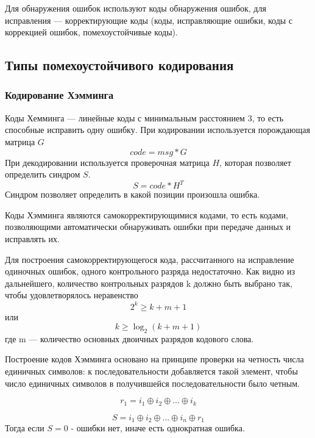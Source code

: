 Для обнаружения ошибок используют коды обнаружения ошибок, для исправления — корректирующие коды (коды, исправляющие ошибки, коды с коррекцией ошибок, помехоустойчивые коды).

\subsection{Типы помехоустойчивого кодирования}
\subsubsection{Кодирование Хэмминга}
Коды Хемминга — линейные коды с минимальным расстоянием 3, то есть способные исправить одну ошибку. 
При кодировании используется порождающая матрица $G$
\begin{equation}
code = msg * G
\end{equation}
При декодировании используется проверочная матрица $H$, которая позволяет определить синдром $S$.
\begin{equation}
S = code * H^T
\end{equation}
Синдром позволяет определить в какой позиции произошла ошибка.

Коды Хэмминга являются самокорректирующимися кодами, то есть кодами, позволяющими автоматически обнаруживать ошибки при передаче данных и исправлять их.

Для построения самокорректирующегося кода, рассчитанного на исправление одиночных ошибок, одного контрольного разряда недостаточно. Как видно из дальнейшего, количество контрольных разрядов k должно быть выбрано так, чтобы удовлетворялось неравенство 
\begin{equation}
2^{k}\geq k+m+1
\end{equation}
или  
\begin{equation}
k \geq \log _{2}(k+m+1) 
\end{equation}
где m — количество основных двоичных разрядов кодового слова.


Построение кодов Хэмминга основано на принципе проверки на четность числа единичных символов: к последовательности добавляется такой элемент, чтобы число единичных символов в получившейся последовательности было четным.

\begin{equation}
	r_1 = i_1 \oplus i_2 \oplus ... \oplus i_k
\end{equation}

\begin{equation}
	S = i_1 \oplus i_2 \oplus ... \oplus i_n \oplus r_1
\end{equation}
Тогда если $S = 0$ - ошибки нет, иначе есть однократная ошибка.

